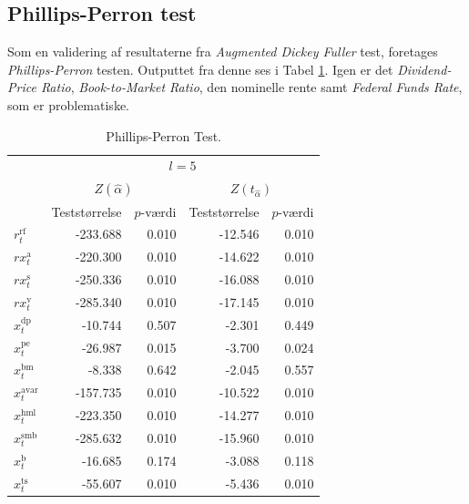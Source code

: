 \documentclass[
  a4paper,
  oneside]{memoir}
\begin{document}
\hypertarget{phillips-perron-test-1}{%
\subsection{Phillips-Perron test}\label{phillips-perron-test-1}}

Som en validering af resultaterne fra \emph{Augmented Dickey Fuller} test, foretages \emph{Phillips-Perron} testen. Outputtet fra denne ses i Tabel \ref{tab:STAT-PP}. Igen er det \emph{Dividend-Price Ratio}, \emph{Book-to-Market Ratio}, den nominelle rente samt \emph{Federal Funds Rate}, som er problematiske.

\begin{table}[H]

\caption{\label{tab:STAT-PP}Phillips-Perron Test.}
\centering
\begin{threeparttable}
\begin{tabular}[t]{lrrrr}
\toprule
\multicolumn{1}{c}{ } & \multicolumn{4}{c}{$l=5$} \\
\cmidrule(l{3pt}r{3pt}){2-5}
\multicolumn{1}{c}{ } & \multicolumn{2}{c}{$Z(\hat{\alpha})$} & \multicolumn{2}{c}{$Z(t_{\hat{\alpha}})$} \\
\cmidrule(l{3pt}r{3pt}){2-3} \cmidrule(l{3pt}r{3pt}){4-5}
  & Teststørrelse & $p$-værdi & Teststørrelse & $p$-værdi\\
\midrule
\rowcolor{gray!6}  $r_t^{\text{rf}}$ & -233.688 & 0.010 & -12.546 & 0.010\\
$rx_t^{\text{a}}$ & -220.300 & 0.010 & -14.622 & 0.010\\
\rowcolor{gray!6}  $rx_t^{\text{s}}$ & -250.336 & 0.010 & -16.088 & 0.010\\
$rx_t^{\text{v}}$ & -285.340 & 0.010 & -17.145 & 0.010\\
\rowcolor{gray!6}  $x_t^{\text{dp}}$ & -10.744 & 0.507 & -2.301 & 0.449\\
$x_t^{\text{pe}}$ & -26.987 & 0.015 & -3.700 & 0.024\\
\rowcolor{gray!6}  $x_t^{\text{bm}}$ & -8.338 & 0.642 & -2.045 & 0.557\\
$x_t^{\text{avar}}$ & -157.735 & 0.010 & -10.522 & 0.010\\
\rowcolor{gray!6}  $x_t^{\text{hml}}$ & -223.350 & 0.010 & -14.277 & 0.010\\
$x_t^{\text{smb}}$ & -285.632 & 0.010 & -15.960 & 0.010\\
\rowcolor{gray!6}  $x_t^{\text{b}}$ & -16.685 & 0.174 & -3.088 & 0.118\\
$x_t^{\text{ts}}$ & -55.607 & 0.010 & -5.436 & 0.010\\

\end{tabular}
\end{threeparttable}
\end{table}
\end{document}
